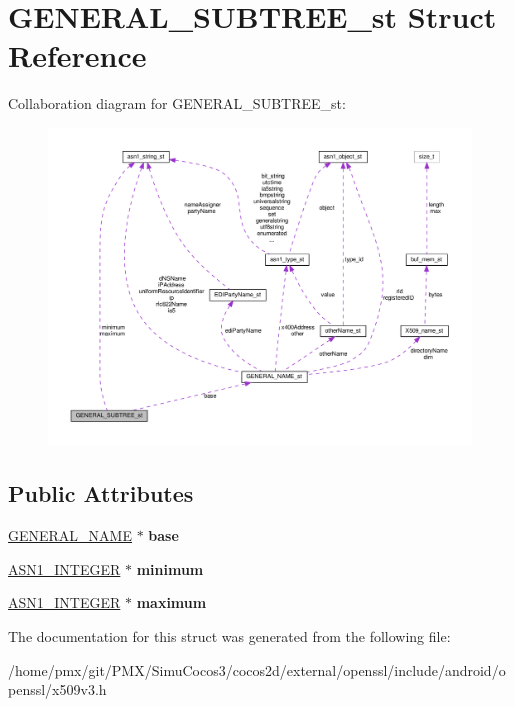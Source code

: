 \hypertarget{structGENERAL__SUBTREE__st}{}\section{G\+E\+N\+E\+R\+A\+L\+\_\+\+S\+U\+B\+T\+R\+E\+E\+\_\+st Struct Reference}
\label{structGENERAL__SUBTREE__st}


Collaboration diagram for G\+E\+N\+E\+R\+A\+L\+\_\+\+S\+U\+B\+T\+R\+E\+E\+\_\+st\+:
\nopagebreak
\begin{figure}[H]
\begin{center}
\leavevmode
\includegraphics[width=350pt]{structGENERAL__SUBTREE__st__coll__graph}
\end{center}
\end{figure}
\subsection*{Public Attributes}
\begin{DoxyCompactItemize}
\item 
\mbox{\label{structGENERAL__SUBTREE__st_a645480c4b3027ba193f530c72cf06d49}} 
\hyperlink{structGENERAL__NAME__st}{G\+E\+N\+E\+R\+A\+L\+\_\+\+N\+A\+ME} $\ast$ {\bfseries base}
\item 
\mbox{\label{structGENERAL__SUBTREE__st_ac3c0e1b43818130facd2dcab9fa9be44}} 
\hyperlink{structasn1__string__st}{A\+S\+N1\+\_\+\+I\+N\+T\+E\+G\+ER} $\ast$ {\bfseries minimum}
\item 
\mbox{\label{structGENERAL__SUBTREE__st_a235890af6ef46496b126c4e23c87dd5b}} 
\hyperlink{structasn1__string__st}{A\+S\+N1\+\_\+\+I\+N\+T\+E\+G\+ER} $\ast$ {\bfseries maximum}
\end{DoxyCompactItemize}


The documentation for this struct was generated from the following file\+:\begin{DoxyCompactItemize}
\item 
/home/pmx/git/\+P\+M\+X/\+Simu\+Cocos3/cocos2d/external/openssl/include/android/openssl/x509v3.\+h\end{DoxyCompactItemize}

